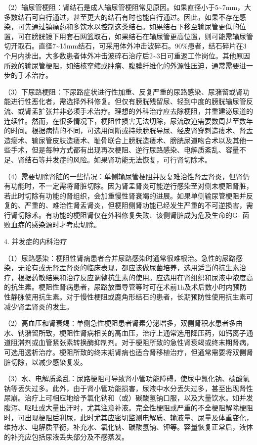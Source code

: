 （2）输尿管梗阻：肾结石是成人输尿管梗阻常见原因。如果直径小于5\textasciitilde{}7mm，大多数结石可自行通过，甚至更大的结石有时也能自行通过。因此，如果不存在感染，可先通过镇痛药和多饮水以控制这类结石。如果结石下移至输尿管更低的位置，可在膀胱镜下用套石网篮取石，如果结石在输尿管更高位置，则可能需输尿管切开取石。直径7\textasciitilde{}15mm结石，可采用体外冲击波碎石。90\%患者，结石碎片在3个月内排出。大多数患者体外冲击波碎石治疗后2\textasciitilde{}3日可重返工作岗位。其他原因所致的输尿管梗阻，如结核挛缩或肿瘤、腹膜纤维化的外源性压迫，通常需要进一步的手术治疗。

（3）下尿路梗阻：下尿路症状进行性加重、反复严重的尿路感染、尿潴留或肾功能进行性恶化者，需选择外科修复。但仅有膀胱残留尿、轻到中度的膀胱输尿管反流、或肾盂扩张并非必须手术治疗。理想的外科治疗应去除梗阻，并重建泌尿道的连续性。然而，在很多情况下，梗阻性损害无法切除，尿流改道需要数周甚至数年的时间。根据病情的不同，可选用间断或持续膀胱导尿、经皮肾穿刺造瘘术、肾盂造瘘术、输尿管皮肤造瘘术、耻骨联合上膀胱造瘘术、膀胱尿道吻合术以及其他一些手术，但是每种方式都有出现再次梗阻、逆行尿路感染、电解质紊乱、容量不足、肾结石等并发症的风险。如果肾功能无法恢复，可行肾切除术。

（4）需要切除肾脏的一些情况：单侧输尿管梗阻并反复难治性肾盂肾炎，但肾仍有功能时，不一定需将肾脏切除。因为肾盂肾炎可能逆行感染至对侧未梗阻肾脏，若此时切除有功能的肾组织，会加重慢性肾衰竭的进展。如果单侧输尿管梗阻并反复的、严重的、难治性肾盂肾炎，但梗阻侧肾功能已经发生严重的不可逆损害，需行肾切除术。有功能的梗阻肾仅在外科修复失败、该侧肾脏成为危及生命的G{-}
菌败血症的感染源时才考虑切除。

4. 并发症的内科治疗

（1）尿路感染：梗阻性肾病患者合并尿路感染时通常很难根治。急性的尿路感染，无论有或无肾盂肾炎的临床表现，都应该做尿菌培养，选用适当的抗生素治疗，根据药敏结果和治疗反应调整抗生素的使用。应选用在肾组织和尿液中浓度高的抗生素。梗阻性肾病患者，尿路放置导管等时可在术前1h及术后数小时内预防性静脉使用抗生素。对于慢性梗阻或鹿角形结石的患者，长期预防性使用抗生素可减少肾盂肾炎的发生。

（2）高血压和肾衰竭：单侧急性梗阻患者肾素分泌增多，双侧肾积水患者多由水、钠潴留所致，梗阻性肾病相关的高血压，治疗上通常选用降压药，如钙离子通道阻滞剂或血管紧张素转换酶抑制剂。对于梗阻所致的急性肾衰竭或终末期肾病，可选用透析治疗。梗阻所致的终末期肾病也适合肾移植治疗，但通常需要将双侧肾脏切除，以减少感染复发。

（3）水、电解质紊乱：尿路梗阻可导致肾小管功能障碍，使尿中氯化钠、碳酸氢钠等丢失过多。此外，由于肾小管功能损害，尿液中水分丢失过多，甚至出现肾性尿崩。治疗上可相应地给予氯化钠和（或）碳酸氢钠口服，以及大量饮水。如并发腹泻、呕吐或大量出汗时，尤其注意补液。完全性梗阻或严重的不全梗阻解除梗阻时，可出现梗阻后利尿，此时尤其应密切监测电解质、输液量、尿量及体重变化，维持水、电解质平衡，补充水、氯化钠、碳酸氢钠、钾等。容量恢复正常后，液体的补充应包括尿液丢失部分及不感蒸发。

